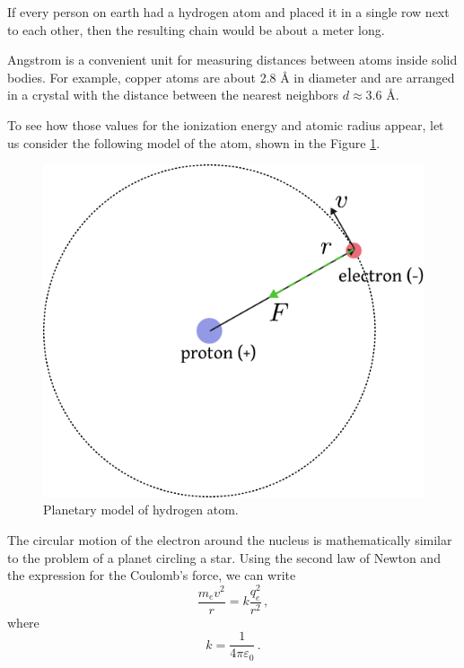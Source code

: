 \begin{tcolorbox}[colback=white!85!ocre, title=$\circledast\,$Illustration]
	If every person on earth had a hydrogen atom and placed it in a single
	row next to each other, then the resulting chain would be about a
	meter long.
\end{tcolorbox}

\begin{tcolorbox}[colback=white!85!ocre, title=\r{A}ngstrom]
	Angstrom is a convenient unit for measuring distances between atoms
	inside solid bodies. For example, copper atoms are about 2.8 \r{A} in
	diameter and are arranged in a crystal with the distance between the
	nearest neighbors $d\approx 3.6$ \r{A}.
\end{tcolorbox}

To see how those values for the ionization energy and atomic radius
appear, let us consider the following model of the atom, shown in the
Figure \ref{fig:hydrogenAtom}.
\begin{figure}[htbp]
	\centering
	\includegraphics[scale=0.6]{hydrogenAtom}
	\caption{Planetary model of hydrogen atom.}
	\label{fig:hydrogenAtom}
\end{figure}

The circular motion of the electron around the nucleus is
mathematically similar to the problem of a planet circling a
star. Using the second law of Newton and the expression for the
Coulomb's force, we can write
\[
\frac{m_ev^2}{r} = k\frac{q_e^2}{r^2}\,,
\]
where
\[
k = \frac{1}{4\pi\varepsilon_0}\,.
\]

